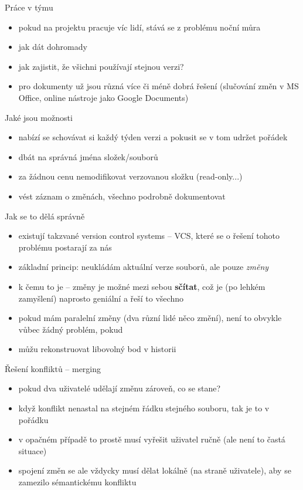 \documentclass{beamer}
\begin{document}
\begin{frame}{Práce v týmu}
  \begin{itemize}
    \item pokud na projektu pracuje víc lidí, stává se z problému noční můra
    \item jak dát dohromady
    \item jak zajistit, že všichni používají stejnou verzi?
    \item pro dokumenty už jsou různá více či méně dobrá řešení (slučování změn v MS Office, online nástroje jako Google Documents)
  \end{itemize}
\end{frame}

\begin{frame}{Jaké jsou možnosti}
  \begin{itemize}
    \item nabízí se schovávat si každý týden verzi a pokusit se v tom udržet pořádek
    \item dbát na správná jména složek/souborů
    \item za žádnou cenu nemodifikovat verzovanou složku (read-only...)
    \item vést záznam o změnách, všechno podrobně dokumentovat
  \end{itemize}
\end{frame}

\begin{frame}{Jak se to dělá správně}
  \begin{itemize}
    \item existují takzvané version control systems -- VCS, které se o řešení tohoto problému postarají za nás
    \item základní princip: neukládám aktuální verze souborů, ale pouze \emph{změny}
    \item k čemu to je -- změny je možné mezi sebou \textbf{sčítat}, což je (po lehkém zamyšlení) naprosto geniální a řeší to všechno
    \item pokud mám paralelní změny (dva různí lidé něco změní), není to obvykle vůbec žádný problém, pokud
    \item můžu rekonstruovat libovolný bod v historii
  \end{itemize}
\end{frame}

\begin{frame}{Řešení konfliktů -- merging}
  \begin{itemize}
    \item pokud dva uživatelé udělají změnu zároveň, co se stane?
    \item když konflikt nenastal na stejném řádku stejného souboru, tak je to v pořádku
    \item v opačném případě to prostě musí vyřešit uživatel ručně (ale není to častá situace)
    \item spojení změn se ale vždycky musí dělat lokálně (na straně uživatele), aby se zamezilo sémantickému konfliktu
  \end{itemize}
\end{frame}
\end{document}
